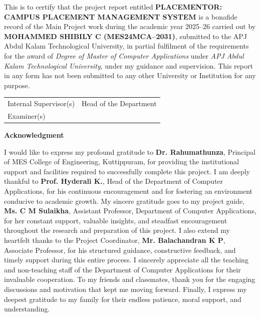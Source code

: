 \documentclass[a4paper,12pt]{report}
\begin{document}
\normalsize
\noindent
This is to certify that the project report entitled \textbf{PLACEMENTOR: CAMPUS PLACEMENT MANAGEMENT SYSTEM} is a bonafide record of the Main Project work during the academic year 2025--26 carried out by \textbf{MOHAMMED SHIBILY C (MES24MCA--2031)}, submitted to the APJ Abdul Kalam Technological University, in partial fulfilment of the requirements for the award of \textit{Degree of Master of Computer Applications} under \textit{APJ Abdul Kalam Technological University}, under my guidance and supervision. This report in any form has not been submitted to any other University or Institution for any purpose.

\vspace{1.5cm}

\begin{tabular}{p{7cm} p{7cm}}
Internal Supervisor(s) & Head of the Department \\[3cm]
Examiner(s) & \\
\end{tabular}

\newpage


\onehalfspacing 

\begin{center}
    \Large\textbf{Acknowledgment}
\end{center}
\vspace{1cm}

\noindent I would like to express my profound gratitude to \textbf{Dr. Rahumathunza}, Principal of MES College of Engineering, Kuttippuram, for providing the institutional support and facilities required to successfully complete this project. I am deeply thankful to \textbf{Prof. Hyderali K.}, Head of the Department of Computer Applications, for his continuous encouragement and for fostering an environment conducive to academic growth. My sincere gratitude goes to my project guide, \textbf{Ms. C M Sulaikha}, Assistant Professor, Department of Computer Applications, for her constant support, valuable insights, and steadfast encouragement throughout the research and preparation of this project. I also extend my heartfelt thanks to the Project Coordinator, \textbf{Mr. Balachandran K P}, Associate Professor, for his structured guidance, constructive feedback, and timely support during this entire process. I sincerely appreciate all the teaching and non-teaching staff of the Department of Computer Applications for their invaluable cooperation. To my friends and classmates, thank you for the engaging discussions and motivation that kept me moving forward. Finally, I express my deepest gratitude to my family for their endless patience, moral support, and understanding.
\end{document}
